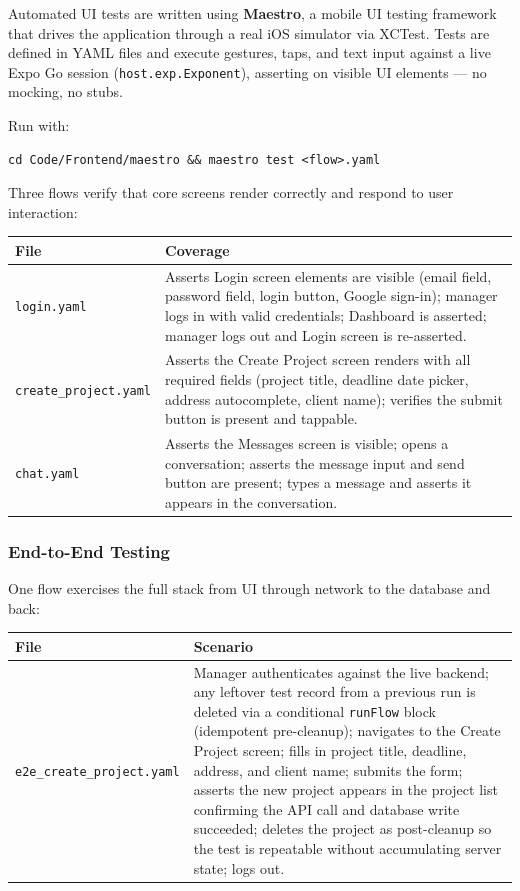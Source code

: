 \documentclass[12pt,a4paper]{article}
\begin{document}
Automated UI tests are written using \textbf{Maestro}, a mobile UI testing framework that drives the application through a real iOS simulator via XCTest. Tests are defined in YAML files and execute gestures, taps, and text input against a live Expo Go session (\texttt{host.exp.Exponent}), asserting on visible UI elements --- no mocking, no stubs.

Run with:
\begin{verbatim}
cd Code/Frontend/maestro && maestro test <flow>.yaml
\end{verbatim}

Three flows verify that core screens render correctly and respond to user interaction:

\begin{tabularx}{\textwidth}{|l|X|}
\hline
\textbf{File} & \textbf{Coverage} \\
\hline
\texttt{login.yaml} &
  Asserts Login screen elements are visible (email field, password field, login button, Google sign-in); manager logs in with valid credentials; Dashboard is asserted; manager logs out and Login screen is re-asserted. \\
\hline
\texttt{create\_project.yaml} &
  Asserts the Create Project screen renders with all required fields (project title, deadline date picker, address autocomplete, client name); verifies the submit button is present and tappable. \\
\hline
\texttt{chat.yaml} &
  Asserts the Messages screen is visible; opens a conversation; asserts the message input and send button are present; types a message and asserts it appears in the conversation. \\
\hline
\end{tabularx}

\subsubsection{End-to-End Testing}

One flow exercises the full stack from UI through network to the database and back:

\begin{tabularx}{\textwidth}{|l|X|}
\hline
\textbf{File} & \textbf{Scenario} \\
\hline
\texttt{e2e\_create\_project.yaml} &
  Manager authenticates against the live backend; any leftover test record from a previous run is deleted via a conditional \texttt{runFlow} block (idempotent pre-cleanup); navigates to the Create Project screen; fills in project title, deadline, address, and client name; submits the form; asserts the new project appears in the project list confirming the API call and database write succeeded; deletes the project as post-cleanup so the test is repeatable without accumulating server state; logs out. \\
\hline
\end{tabularx}
\end{document}
